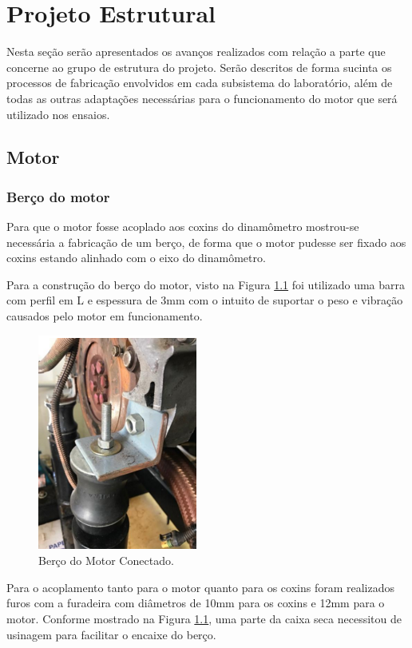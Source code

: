 \chapter[Projeto Estrutural]{Projeto Estrutural}

Nesta seção serão apresentados os avanços realizados com relação a parte que concerne ao grupo de estrutura do projeto. Serão descritos de forma sucinta os processos de fabricação envolvidos em cada subsistema do laboratório, além de todas as outras adaptações necessárias para o funcionamento do motor que será utilizado nos ensaios.

\section{Motor}

\subsection{Berço do motor}

Para que o motor fosse acoplado aos coxins do dinamômetro mostrou-se necessária a fabricação de um berço, de forma que o motor pudesse ser fixado aos coxins estando alinhado com o eixo do dinamômetro. 

Para a construção do berço do motor, visto na Figura \ref{fig:bercomotor} foi utilizado uma barra com perfil em L e espessura de 3mm com o intuito de suportar o peso e vibração causados pelo motor em funcionamento.

\begin{figure}[h!]
	\centering
	\includegraphics[keepaspectratio=true,scale= 0.8]{figuras/berco-motor.png}
	\caption{Berço do Motor Conectado.}
	\label{fig:bercomotor}
\end{figure}

Para o acoplamento tanto para o motor quanto para os coxins foram realizados furos com a furadeira com diâmetros de 10mm para os coxins e 12mm para o motor. Conforme mostrado na Figura \ref{fig:bercomotor}, uma parte da caixa seca necessitou de usinagem para facilitar o encaixe do berço.

